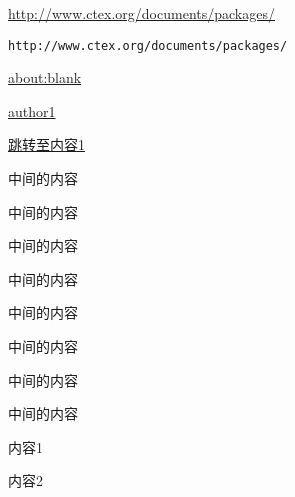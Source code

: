 \documentclass{article}
\begin{document}
    \url{http://www.ctex.org/documents/packages/}

    \nolinkurl{http://www.ctex.org/documents/packages/}

    \url{about:blank}

    \href{http://www.ctex.org/documents/packages/}{author1}

    \hyperlink{author2}{跳转至内容1}

    中间的内容

    中间的内容

    中间的内容

    中间的内容

    中间的内容

    中间的内容

    中间的内容

    中间的内容

    \hypertarget{author2}{内容1}

    内容2
\end{document}
